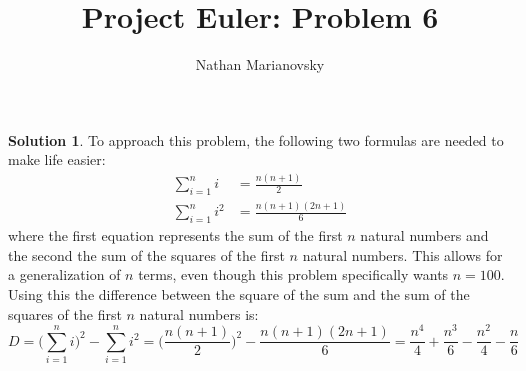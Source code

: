 \documentclass[12pt, letterpaper, onecolumn, conference, final]{IEEEtran}
\title{Project Euler: Problem 6}
\author{Nathan Marianovsky}
\theoremstyle{definition}
\newtheorem*{problem*}{Problem}
\newtheorem*{solution*}{Solution}
\theoremstyle{plain}
\begin{document}
\maketitle

\begin{center}
\end{center}

\vspace{.3cm}
\begin{solution*}
To approach this problem, the following two formulas are needed to make life easier:
\begin{equation*}
\begin{split}
\sum_{i=1}^n i &= \frac{n(n+1)}{2} \\
\sum_{i=1}^n i^2 &= \frac{n(n+1)(2n+1)}{6}
\end{split}
\end{equation*}
where the first equation represents the sum of the first $n$ natural numbers and the second the sum of the squares of the first $n$ natural numbers. This allows for a generalization of $n$ terms, even though this problem specifically wants $n=100$. Using this the difference between the square of the sum and the sum of the squares of the first $n$ natural numbers is:
\begin{equation*}
D = \Big( \sum_{i=1}^n i \Big)^2 - \sum_{i=1}^n i^2 = \Big( \frac{n(n+1)}{2} \Big)^2 - \frac{n(n+1)(2n+1)}{6} = \frac{n^4}{4} + \frac{n^3}{6} - \frac{n^2}{4} - \frac{n}{6}
\end{equation*}
\end{solution*}
\end{document}

